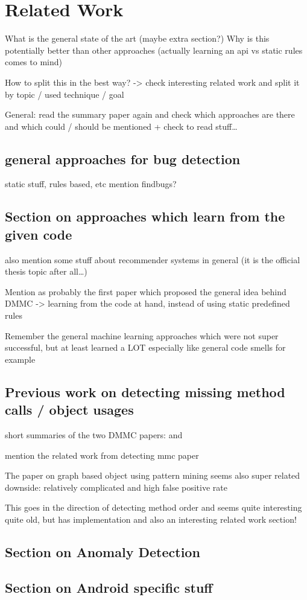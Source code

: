 \chapter{Related Work}

What is the general state of the art (maybe extra section?)
Why is this potentially better than other approaches (actually learning an api vs static rules comes to mind)

How to split this in the best way?
-> check interesting related work and split it by topic / used technique / goal

General: read the summary paper \cite{robillard2013automated} again and check which approaches are there and which could / should be mentioned
+ check to read stuff\ldots

\section{general approaches for bug detection}
static stuff, rules based, etc
mention findbugs?

\section{Section on approaches which learn from the given code}
also mention some stuff about recommender systems in general (it is the official thesis topic after all\ldots)

Mention \cite{engler2001bugs} as probably the first paper which proposed the general idea behind DMMC -> learning from the code at hand, instead of using static predefined rules

Remember the general machine learning approaches which were not super successful, but at least learned a LOT
especially like general code smells for example

\section{Previous work on detecting missing method calls / object usages}
short summaries of the two DMMC papers: \cite{monperrus2010detecting} and \cite{monperrus2013detecting}

mention the related work from detecting mmc paper

The paper on graph based object using pattern mining seems also super related \cite{nguyen2009graph}
downside: relatively complicated and high false positive rate

This \cite{wasylkowski2007detecting} goes in the direction of detecting method order and seems quite interesting
quite old, but has implementation and also an interesting related work section!

\section{Section on Anomaly Detection}

\section{Section on Android specific stuff}

